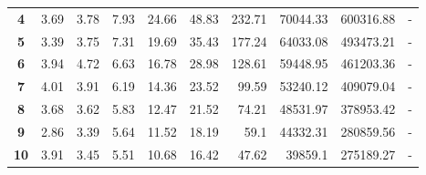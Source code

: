 \begin{table}[h]
\begin{center}
\begin{tabular}{crrrrrrrrr}
\textbf{4}                         & 3.69                           & 3.78                           & 7.93                        & 24.66                          & 48.83                           & 232.71                          & 70044.33                        & 600316.88                        & -                                \\
\textbf{5}                         & 3.39                           & 3.75                         & 7.31                       & 19.69                          & 35.43                           & 177.24                          & 64033.08                        & 493473.21                        & -                                \\
\textbf{6}                         & 3.94                           & 4.72                          & 6.63                         & 16.78                          & 28.98                           & 128.61                          & 59448.95                        & 461203.36                        & -                                \\
\textbf{7}                         & 4.01                           & 3.91                          & 6.19                        & 14.36                          & 23.52                           & 99.59                           & 53240.12                        & 409079.04                        & -                                \\
\textbf{8}                         & 3.68                           & 3.62                           & 5.83                        & 12.47                          & 21.52                           & 74.21                           & 48531.97                        & 378953.42                        & -                                \\
\textbf{9}                         & 2.86                           & 3.39                          & 5.64                        & 11.52                          & 18.19                           & 59.1                            & 44332.31                        & 280859.56                        & -                                \\
\textbf{10}                        & 3.91                           & 3.45                           & 5.51                           & 10.68                          & 16.42                           & 47.62                           & 39859.1                         & 275189.27                        & -                                \\

\end{tabular}
\end{center}
\end{table}
